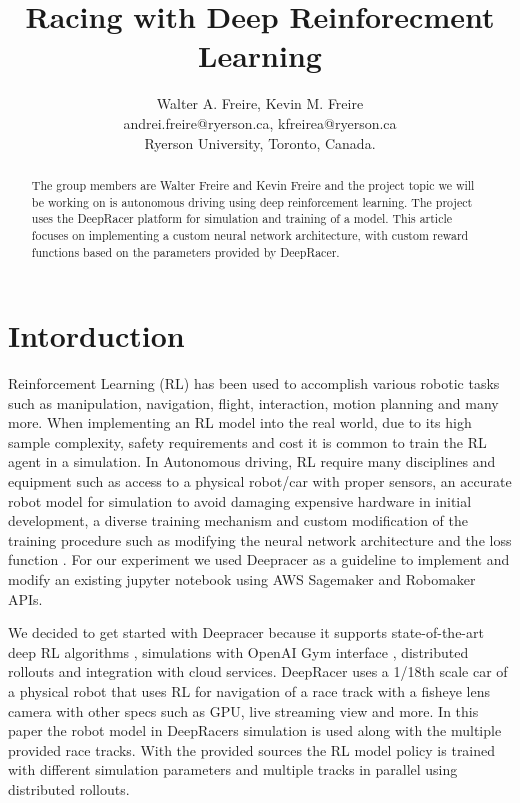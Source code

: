\documentclass[journal]{IEEEtran}
\begin{document}
\title{Racing with Deep Reinforecment Learning}
\author{Walter A. Freire, Kevin M. Freire\\
andrei.freire@ryerson.ca, kfreirea@ryerson.ca\\
Ryerson University, Toronto, Canada.}
\maketitle
\begin{abstract}
The group members are Walter Freire and Kevin Freire and the project topic we will be working on is autonomous driving using deep reinforcement learning. The project uses the DeepRacer platform for simulation and training of a model. This article focuses on implementing a custom neural network architecture, with custom reward functions based on the parameters provided by DeepRacer.  
\end{abstract}

\section{Intorduction}
Reinforcement Learning (RL) has been used to accomplish various robotic tasks such as manipulation, navigation, flight, interaction, motion planning and many more. When implementing an RL model into the real world, due to its high sample complexity, safety requirements and cost it is common to train the RL agent in a simulation. In Autonomous driving, RL require many disciplines and equipment such as access to a physical robot/car with proper sensors, an accurate robot model for simulation to avoid damaging expensive hardware in initial development, a diverse training mechanism and custom modification of the training procedure such as modifying the neural network architecture and the loss function \cite{9197465}. For our experiment we used Deepracer as a guideline to implement and modify an existing jupyter notebook using AWS Sagemaker and Robomaker APIs.

We decided to get started with Deepracer because it supports state-of-the-art deep RL algorithms \cite{caspi10reinforcement}, simulations with OpenAI Gym interface \cite{brockman2016openai}, distributed rollouts and integration with cloud services. DeepRacer uses a 1/18th scale car of a physical robot that uses RL for navigation of a race track with a fisheye lens camera \cite{9197465} with other specs such as GPU, live streaming view and more. In this paper the robot model in DeepRacers simulation is used along with the multiple provided race tracks. With the provided sources the RL model policy is trained with different simulation parameters and multiple tracks in parallel using distributed rollouts.
\end{document}
